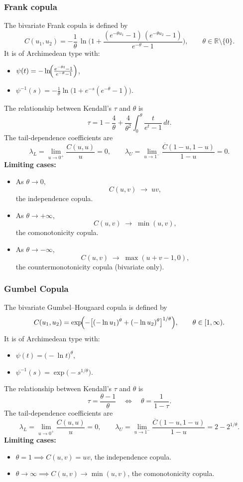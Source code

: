 \documentclass[11pt]{article}
\newcommand{\noi}{\noindent}
\begin{document}
\subsubsection{Frank copula}
\noi The bivariate Frank copula is defined by
\[
C(u_1,u_2)
=-\frac{1}{\theta}\,
\ln\!\Biggl(
1+\frac{(e^{-\theta u_1}-1)\,(e^{-\theta u_2}-1)}{e^{-\theta}-1}
\Biggr),
\qquad \theta\in\mathbb{R}\setminus\{0\}.
\]
\noi It is of Archimedean type with:
\begin{itemize}
  \item $\displaystyle \psi(t)
    =-\ln\!\Bigl(\tfrac{e^{-\theta t}-1}{\,e^{-\theta}-1}\Bigr)$,
  \item $\displaystyle \psi^{-1}(s)
    =-\tfrac{1}{\theta}\ln\!\bigl(1+e^{-s}(e^{-\theta}-1)\bigr)$.
\end{itemize}
\noi The relationship between Kendall’s $\tau$ and $\theta$ is
\[
\tau
=1-\frac{4}{\theta}+\frac{4}{\theta^2}
\int_{0}^{\theta}\frac{t}{e^t-1}\,dt.
\]
\noi The tail‐dependence coefficients are
\[
\lambda_L
=\lim_{u\to0^+}\frac{C(u,u)}{u}
=0,
\qquad
\lambda_U
=\lim_{u\to1^-}\frac{\overline{C}(1-u,1-u)}{1-u}
=0.
\]
\noi \textbf{Limiting cases:}
\begin{itemize}
  \item As $\theta\to0$, 
    \[
      C(u,v)\;\to\;uv,
    \]
    the independence copula.
  \item As $\theta\to+\infty$, 
    \[
      C(u,v)\;\to\;\min(u,v),
    \]
    the comonotonicity copula.
  \item As $\theta\to-\infty$, 
    \[
      C(u,v)\;\to\;\max(u+v-1,0),
    \]
    the countermonotonicity copula (bivariate only).
\end{itemize}


\subsubsection{Gumbel Copula}
\noi The bivariate Gumbel–Hougaard copula is defined by
\[
C(u_1,u_2)
=\exp\!\Bigl(-\bigl[(-\ln u_1)^\theta+(-\ln u_2)^\theta\bigr]^{1/\theta}\Bigr),
\qquad \theta\in[1,\infty).
\]
\noi It is of Archimedean type with:
\begin{itemize}
  \item $\displaystyle \psi(t)=\bigl(-\ln t\bigr)^\theta$,
  \item $\displaystyle \psi^{-1}(s)=\exp\bigl(-s^{1/\theta}\bigr)$.
\end{itemize}
\noi The relationship between Kendall’s $\tau$ and $\theta$ is
\[
\tau=\frac{\theta-1}{\theta}
\quad\Longleftrightarrow\quad
\theta=\frac{1}{1-\tau}.
\]
\noi The tail‐dependence coefficients are
\[
\lambda_L
=\lim_{u\to0^+}\frac{C(u,u)}{u}
=0,
\qquad
\lambda_U
=\lim_{u\to1^-}\frac{\overline{C}(1-u,1-u)}{1-u}
=2-2^{1/\theta}.
\]
\noi \textbf{Limiting cases:}
\begin{itemize}
  \item $\theta=1\implies C(u,v)=uv$, the independence copula.
  \item $\theta\to\infty\implies C(u,v)\to\min(u,v)$, the comonotonicity copula.
\end{itemize}
\end{document}
